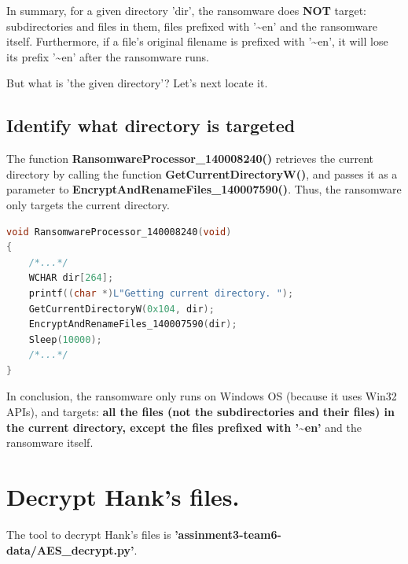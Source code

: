 \documentclass[11pt]{article}
\begin{document}
In summary, for a given directory 'dir', the ransomware does \textbf{NOT} target: subdirectories and files in them, files prefixed with '\textasciitilde en' and the ransomware itself. Furthermore, if a file's original filename is prefixed with '\textasciitilde en', it will lose its prefix '\textasciitilde en' after the ransomware runs.

But what is 'the given directory'? Let's next locate it.

\subsection{Identify what directory is targeted}
The function \textbf{RansomwareProcessor\_140008240()} retrieves the current directory by calling the function \textbf{GetCurrentDirectoryW()}, and passes it as a parameter to \textbf{EncryptAndRenameFiles\_140007590()}. Thus, the ransomware only targets the current directory.
\begin{lstlisting}[language=c++, caption=Part of RansomwareProcessor\_140008240]
void RansomwareProcessor_140008240(void)
{
    /*...*/
    WCHAR dir[264];
    printf((char *)L"Getting current directory. ");
    GetCurrentDirectoryW(0x104, dir);
    EncryptAndRenameFiles_140007590(dir);
    Sleep(10000);
    /*...*/
}
\end{lstlisting}

In conclusion, the ransomware only runs on Windows OS (because it uses Win32 APIs), and targets: \textbf{all the files (not the subdirectories and their files) in the current directory, except the files prefixed with '\textasciitilde en'} and the ransomware itself.

\section{Decrypt Hank's files.}
The tool to decrypt Hank's files is \textbf{'assinment3-team6-data/AES\_decrypt.py'}.



\end{document}
